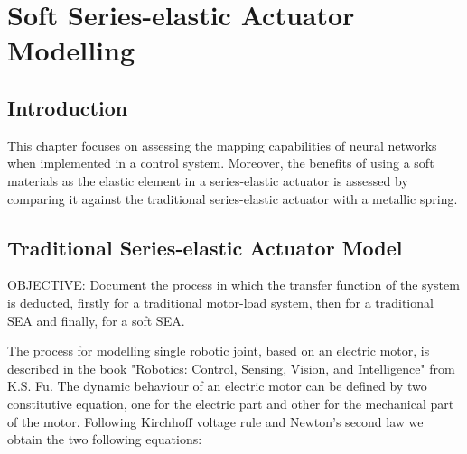 \chapter{Soft Series-elastic Actuator Modelling}

\section{Introduction}

This chapter focuses on assessing the mapping capabilities of neural networks when implemented in a control system. Moreover, the benefits of using a soft materials as the elastic element in a series-elastic actuator is assessed by comparing it against the traditional series-elastic actuator with a metallic spring.

\section{Traditional Series-elastic Actuator Model}

OBJECTIVE: Document the process in which the transfer function of the system is deducted, firstly for a traditional motor-load system, then for a traditional SEA and finally, for a soft SEA.

The process for modelling single robotic joint, based on an electric motor, is described in the book "Robotics: Control, Sensing, Vision, and Intelligence" from K.S. Fu. The dynamic behaviour of an electric motor can be defined by two constitutive equation, one for the electric part and other for the mechanical part of the motor. Following Kirchhoff voltage rule and Newton's second law we obtain the two following equations:

